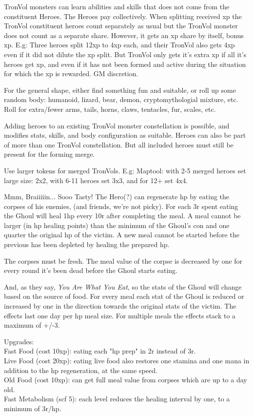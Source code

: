 TronVol monsters can learn abilities and skills that does not come from the constituent Heroes. The Heroes pay collectively. When splitting received xp the TronVol constituent heroes count separately as usual but the TronVol monster does not count as a separate share. However, it gets an xp share by itself, bonus xp. E.g: Three heroes split 12xp to 4xp each, and their TronVol also gets 4xp even if it did not dilute the xp split. But TronVol only gets it's extra xp if all it's heroes get xp, and even if it has not been formed and active during the situation for which the xp is rewarded. GM discretion.

For the general shape, either find something fun and suitable, or roll up some random body: humanoid, lizard, bear, demon, cryptomythologial mixture, etc. Roll for extra/fewer arms, tails, horns, claws, tentacles, fur, scales, etc.

Adding heroes to an existing TronVol monster constellation is possible, and modifies stats, skills, and body configuration as suitable. Heroes can also be part of more than one TronVol constellation. But all included heroes must still be present for the forming merge.

Use larger tokens for merged TronVols. E.g: Maptool: with 2-5 merged heroes set large size: 2x2, with 6-11 heroes set 3x3, and for 12+ set 4x4.


 Mmm, Braiiiiin... Sooo Tasty!
The Hero(?) can regenerate hp by eating the corpses of his enemies, (and friends, we're not picky). For each 3r spent eating the Ghoul will heal 1hp every 10r after completing the meal. A meal cannot be larger (in hp healing points) than the minimum of the Ghoul's con and one quarter the original hp of the victim. A new meal cannot be started before the previous has been depleted by healing the prepared hp.

The corpses must be fresh. The meal value of the corpse is decreased by one for every round it's been dead before the Ghoul starts eating.

And, as they say, \emph{You Are What You Eat}, so the stats of the Ghoul will change based on the source of food. For every meal each stat of the Ghoul is reduced or increased by one in the direction towards the original stats of the victim. The effects last one day per hp meal size. For multiple meals the effects stack to a maximum of +/-3.

Upgrades:\\
Fast Food (cost 10xp): eating each "hp prep" in 2r instead of 3r.\\
Live Food (cost 20xp): eating live food also restores one stamina and one mana in addition to the hp regeneration, at the same speed.\\
Old Food (cost 10xp): can get full meal value from corpses which are up to a day old. \\
Fast Metabolism (scf 5): each level reduces the healing interval by one, to a minimum of 3r/hp.


